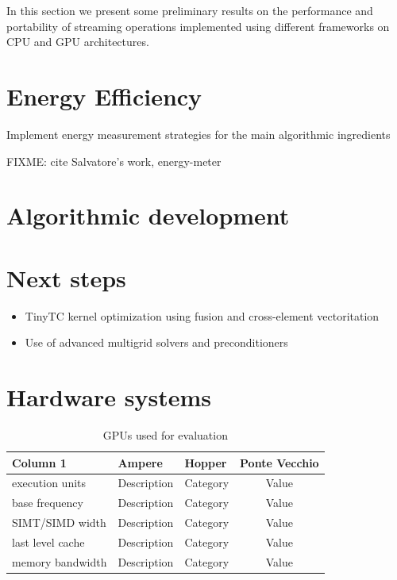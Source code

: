 \documentclass[a4paper,12pt]{article}
\begin{document}
In this section we present some preliminary results on the performance and portability of
streaming operations implemented using different frameworks on CPU and GPU architectures.



\section{Energy Efficiency}

Implement energy measurement strategies for the main algorithmic ingredients

FIXME: cite Salvatore's work, energy-meter 

\section{Algorithmic development}


\section{Next steps}

\begin{itemize}
    \item TinyTC kernel optimization using fusion and cross-element vectoritation
    \item Use of advanced multigrid solvers and preconditioners
\end{itemize}


\section{Hardware systems}

\begin{center}
    \begin{table}[h!]
    \small
    \caption{GPUs used for evaluation}
    \renewcommand{\arraystretch}{1.25}
    \label{tab:example_table}
    \begin{tabular}{|l|l|l|c|}
    \hline
    \textbf{Column 1} & \textbf{Ampere} & \textbf{Hopper} & \textbf{Ponte Vecchio} \\
    \hline
    execution units & Description & Category & Value \\
    base frequency & Description & Category & Value \\
    SIMT/SIMD width & Description & Category & Value \\
    last level cache & Description & Category & Value \\
    memory bandwidth & Description & Category & Value \\
    \hline
    \end{tabular}
    \end{table}
\end{center}


\label{MyLastPage}
\end{document}

